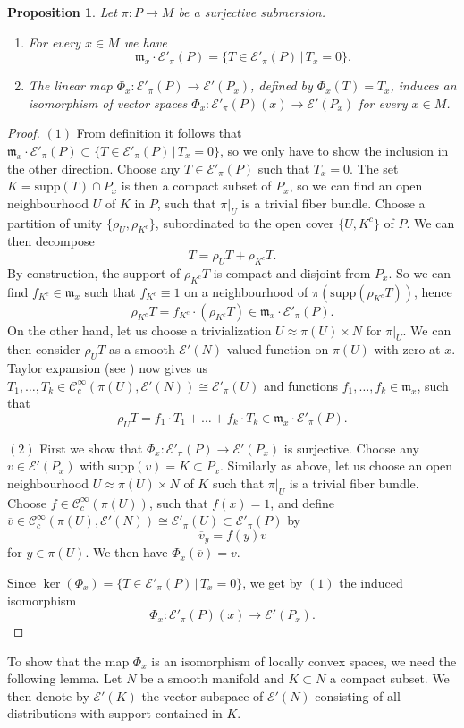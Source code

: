 \documentclass[a4paper]{amsart}
\newtheorem{prop}[dfn]{Proposition}
\newcommand{\cE}{\mathcal{E}}
\newcommand{\fm}{\mathfrak{m}}
\newcommand{\supp}{\mathord{\mathrm{supp}}}
\newcommand{\Cc}{\mathord{\mathcal{C}^{\infty}_{c}}}
\begin{document}
\begin{prop}\label{Localization of transversal distributions}
Let $\pi:P\to M$ be a surjective submersion.
\begin{enumerate}
\item For every $x\in M$ we have 
\[
\fm_{x}\cdot\cE'_{\pi}(P)=\{T\in\cE'_{\pi}(P)\,|\,T_{x}=0\}.
\]
\item The linear map $\Phi_{x}:\cE'_{\pi}(P)\to\cE'(P_{x})$, defined by $\Phi_{x}(T)=T_{x}$, induces
an isomorphism of vector spaces $\Phi_{x}:\cE'_{\pi}(P)(x)\to\cE'(P_{x})$ for every $x\in M$.
\end{enumerate}
\end{prop}
\begin{proof}
$(1)$ From definition it follows that $\fm_{x}\cdot\cE'_{\pi}(P)\subset\{T\in\cE'_{\pi}(P)\,|\,T_{x}=0\}$, 
so we only have to show the inclusion in the other direction. Choose
any $T\in\cE'_{\pi}(P)$ such that $T_{x}=0$. The set $K=\supp(T)\cap P_{x}$ is then a compact subset of $P_{x}$, so we can
find an open neighbourhood $U$ of $K$ in $P$, such that $\pi|_{U}$ is a trivial fiber bundle. Choose a partition
of unity $\{\rho_{U},\rho_{K^{c}}\}$, subordinated to the open cover $\{U,K^{c}\}$ of $P$. We can then decompose
\[
T=\rho_{U}T+\rho_{K^{c}}T.
\]
By construction, the support of $\rho_{K^{c}}T$ is compact and disjoint from $P_{x}$. So we can find $f_{K^{c}}\in\fm_{x}$ such that $f_{K^{c}}\equiv 1$
on a neighbourhood of $\pi(\supp(\rho_{K^{c}}T))$, hence 
\[
\rho_{K^{c}}T=f_{K^{c}}\cdot(\rho_{K^{c}}T)\in\fm_{x}\cdot\cE'_{\pi}(P).
\] 
On the other hand, let us choose a trivialization
$U\approx \pi(U)\times N$ for $\pi|_{U}$. We can then consider $\rho_{U}T$ as a smooth $\cE'(N)$-valued function on $\pi(U)$ with zero at $x$.
Taylor expansion (see \cite{KrMi97}) now gives us $T_{1},\ldots,T_{k}\in\Cc(\pi(U),\cE'(N))\cong\cE'_{\pi}(U)$ and
functions $f_{1},\ldots,f_{k}\in\fm_{x}$, such that
\[
\rho_{U}T=f_{1}\cdot T_{1}+\ldots+f_{k}\cdot T_{k}\in\fm_{x}\cdot\cE'_{\pi}(P).
\]

$(2)$ First we show that $\Phi_{x}:\cE'_{\pi}(P)\to\cE'(P_{x})$ is surjective. 
Choose any $v\in\cE'(P_{x})$ with $\supp(v)=K\subset P_{x}$. Similarly as above, let us choose an 
open neighbourhood $U\approx \pi(U)\times N$ of $K$ such that $\pi|_{U}$ is a trivial fiber bundle. Choose $f\in\Cc(\pi(U))$,
such that $f(x)=1$, and define $\overline{v}\in\Cc(\pi(U),\cE'(N))\cong\cE'_{\pi}(U)\subset\cE'_{\pi}(P)$ by 
\[
\overline{v}_{y}=f(y)v
\]
for $y\in\pi(U)$. We then have $\Phi_{x}(\overline{v})=v$. 

Since $\ker(\Phi_{x})=\{T\in\cE'_{\pi}(P)\,|\,T_{x}=0\}$, we get by $(1)$ the induced isomorphism
\[
\Phi_{x}:\cE'_{\pi}(P)(x)\to\cE'(P_{x}).
\]
\end{proof}
To show that the map $\Phi_{x}$ is an isomorphism of locally convex spaces, we need the following lemma.
Let $N$ be a smooth manifold and $K\subset N$ a compact subset. We then denote by $\cE'(K)$ 
the vector subspace of $\cE'(N)$ consisting of all distributions with support contained in $K$.
\end{document}
